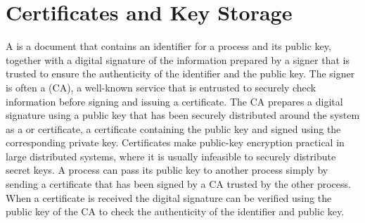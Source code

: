 \section{Certificates and Key Storage}\label{Se:CertificatesKeyStorage}
A  is a document that contains an identifier for a process
and its public key, together with a digital signature of the information
prepared by a signer that is trusted to ensure the authenticity of
the identifier and the public key.
The signer is often a  (CA), a well-known
service that is entrusted to securely check information before signing and issuing
a certificate. The CA prepares a digital signature using a public key that has been securely
distributed around the system as a  or  certificate,
a certificate containing the public key and signed using the corresponding private key.
Certificates make public-key encryption practical in large distributed systems,
where it is usually infeasible to securely distribute secret keys.
A process can pass its public key to another process simply by sending a
certificate that has been signed by a CA trusted by the other process.
When a certificate is received the digital signature can be verified using the
public key of the CA to check the authenticity of the identifier and public key.

